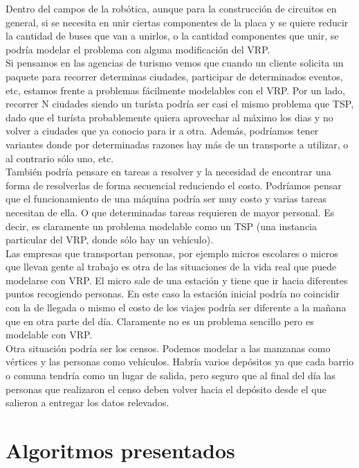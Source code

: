 \documentclass[11pt,a4paper]{article}
\begin{document}
Dentro del campos de la robótica, aunque para la construcción de circuitos en general, si se necesita en unir ciertas componentes de la placa y se quiere reducir la cantidad de buses que van a unirlos, o la cantidad componentes que unir, se podría modelar el problema con alguna modificación del VRP.\\

Si pensamos en las agencias de turismo vemos que cuando un cliente solicita un paquete para recorrer determinas ciudades, participar de determinados eventos, etc, estamos frente a problemas fácilmente modelables con el VRP. Por un lado, recorrer N ciudades siendo un turísta podría ser casi el mismo problema que TSP, dado que el turísta probablemente quiera aprovechar al máximo los dias y no volver a ciudades que ya conocio para ir a otra. Además, podríamos tener variantes donde por determinadas razones hay más de un transporte a utilizar, o al contrario sólo uno, etc. \\

También podría pensare en tareas a resolver y la necesidad de encontrar una forma de resolverlas de forma secuencial reduciendo el costo. Podríamos pensar que el funcionamiento de una máquina podría ser muy costo y varias tareas necesitan de ella. O que determinadas tareas requieren de mayor personal. Es decir, es claramente un problema modelable como un TSP (una instancia particular del VRP, donde sólo hay un vehículo).	\\


Las empresas que transportan personas, por ejemplo micros escolares o micros que llevan gente al trabajo es otra de las situaciones de la vida real que puede modelarse con VRP. El micro sale de una estación y tiene que ir hacia diferentes puntos recogiendo personas. En este caso la estación inicial podría no coincidir con la de llegada o mismo el costo de los viajes podría ser diferente a la mañana que en otra parte del día. Claramente no es un problema sencillo pero es modelable con VRP.
\\

Otra situación podría ser los censos. Podemos modelar a las manzanas como vértices y las personas como vehículos. Habría varios depósitos ya que cada barrio o comuna tendría como un lugar de salida, pero seguro que al final del día las personas que realizaron el censo deben volver hacia el depósito desde el que salieron a entregar los datos relevados.


\section{Algoritmos presentados}
\end{document}
